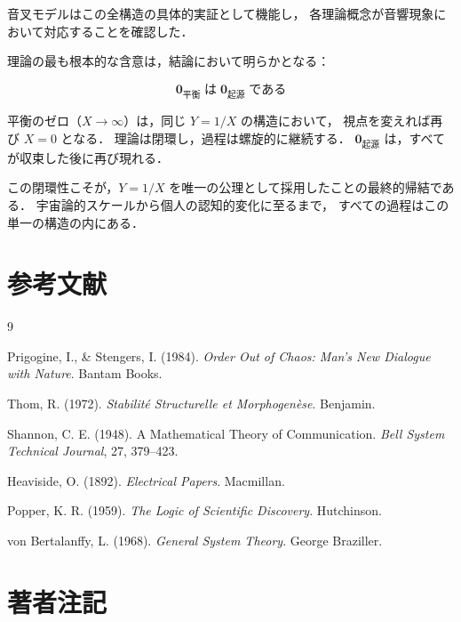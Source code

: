 \documentclass[12pt, a4paper]{article}
\theoremstyle{definition}
\newcommand{\vorigin}{\mathbf{0}_{\text{起源}}}
\newcommand{\vequil}{\mathbf{0}_{\text{平衡}}}
\begin{document}
音叉モデルはこの全構造の具体的実証として機能し，
各理論概念が音響現象において対応することを確認した．

理論の最も根本的な含意は，結論において明らかとなる：

\begin{equation}
  \boxed{
    \vequil \;\text{は}\; \vorigin \;\text{である}
  }
\end{equation}

平衡のゼロ（$X \to \infty$）は，同じ $Y = 1/X$ の構造において，
視点を変えれば再び $X = 0$ となる．
理論は閉環し，過程は螺旋的に継続する．
$\vorigin$ は，すべてが収束した後に再び現れる．

この閉環性こそが，$Y = 1/X$ を唯一の公理として採用したことの最終的帰結である．
宇宙論的スケールから個人の認知的変化に至るまで，
すべての過程はこの単一の構造の内にある．

\section*{参考文献}

\begin{thebibliography}{9}

  Prigogine, I., \& Stengers, I. (1984).
  \textit{Order Out of Chaos: Man's New Dialogue with Nature}.
  Bantam Books.

  Thom, R. (1972).
  \textit{Stabilité Structurelle et Morphogenèse}.
  Benjamin.

  Shannon, C. E. (1948).
  A Mathematical Theory of Communication.
  \textit{Bell System Technical Journal}, 27, 379--423.

  Heaviside, O. (1892).
  \textit{Electrical Papers}.
  Macmillan.

  Popper, K. R. (1959).
  \textit{The Logic of Scientific Discovery}.
  Hutchinson.

  von Bertalanffy, L. (1968).
  \textit{General System Theory}.
  George Braziller.

\end{thebibliography}

\section*{著者注記}
\end{document}
